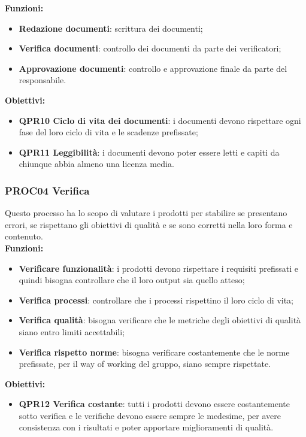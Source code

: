 \documentclass[../piano_di_qualifica.tex]{subfiles}
\begin{document}
\textbf{Funzioni:}
\smallbreak
\begin{itemize}
	\item \textbf{Redazione documenti}: scrittura dei documenti;
	\item \textbf{Verifica documenti}: controllo dei documenti da parte dei verificatori;
	\item \textbf{Approvazione documenti}: controllo e approvazione finale da parte del responsabile.
\end{itemize}

\textbf{Obiettivi:}
\smallbreak
\begin{itemize}
	\item \textbf{QPR10 Ciclo di vita dei documenti}: i documenti devono rispettare ogni fase del loro ciclo di vita e le scadenze prefissate;
	\item \textbf{QPR11 Leggibilità}: i documenti devono poter essere letti e capiti da chiunque abbia almeno una licenza media.
\end{itemize}

\subsubsection{PROC04 Verifica}
Questo processo ha lo scopo di valutare i prodotti per stabilire se presentano errori, se rispettano gli obiettivi di qualità e se sono corretti nella loro forma e contenuto. \\

\textbf{Funzioni:}
\smallbreak
\begin{itemize}
	\item \textbf{Verificare funzionalità}:  i prodotti devono rispettare i requisiti prefissati e quindi bisogna controllare che il loro output sia quello atteso;
	\item \textbf{Verifica processi}:  controllare che i processi rispettino il loro ciclo di vita;
	\item \textbf{Verifica qualità}:  bisogna verificare che le metriche degli obiettivi di qualità siano entro limiti accettabili;
	\item \textbf{Verifica rispetto norme}: bisogna verificare costantemente che le norme prefissate, per il way of working del gruppo, siano sempre rispettate.
\end{itemize}

\textbf{Obiettivi:}
\smallbreak
\begin{itemize}
	\item \textbf{QPR12 Verifica costante}: tutti i prodotti devono essere costantemente sotto verifica e le verifiche devono essere sempre le medesime, per avere consistenza con i risultati e poter apportare miglioramenti di qualità.
\end{itemize}
\end{document}
